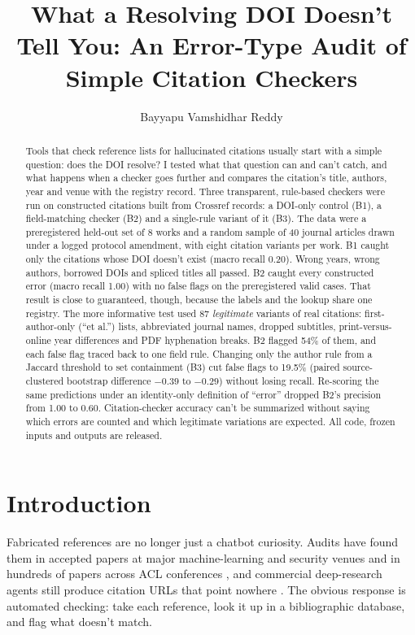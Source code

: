 \documentclass[acmsmall,screen,nonacm]{acmart}
\title{What a Resolving DOI Doesn't Tell You: An Error-Type Audit of Simple Citation Checkers}
\author{Bayyapu Vamshidhar Reddy}
\affiliation{\institution{Indian Institute of Information Technology Allahabad}\city{Prayagraj}\country{India}}
\newcommand{\BOne}{B1}
\newcommand{\BTwo}{B2}
\newcommand{\BThree}{B3}
\begin{document}
\begin{abstract}
Tools that check reference lists for hallucinated citations usually start with a simple question: does the DOI resolve? I tested what that question can and can't catch, and what happens when a checker goes further and compares the citation's title, authors, year and venue with the registry record. Three transparent, rule-based checkers were run on constructed citations built from Crossref records: a DOI-only control (\BOne{}), a field-matching checker (\BTwo{}) and a single-rule variant of it (\BThree{}). The data were a preregistered held-out set of 8 works and a random sample of 40 journal articles drawn under a logged protocol amendment, with eight citation variants per work. \BOne{} caught only the citations whose DOI doesn't exist (macro recall 0.20). Wrong years, wrong authors, borrowed DOIs and spliced titles all passed. \BTwo{} caught every constructed error (macro recall 1.00) with no false flags on the preregistered valid cases. That result is close to guaranteed, though, because the labels and the lookup share one registry. The more informative test used 87 \emph{legitimate} variants of real citations: first-author-only (``et al.'') lists, abbreviated journal names, dropped subtitles, print-versus-online year differences and PDF hyphenation breaks. \BTwo{} flagged 54\% of them, and each false flag traced back to one field rule. Changing only the author rule from a Jaccard threshold to set containment (\BThree{}) cut false flags to 19.5\% (paired source-clustered bootstrap difference $-0.39$ to $-0.29$) without losing recall. Re-scoring the same predictions under an identity-only definition of ``error'' dropped \BTwo{}'s precision from 1.00 to 0.60. Citation-checker accuracy can't be summarized without saying which errors are counted and which legitimate variations are expected. All code, frozen inputs and outputs are released.
\end{abstract}

\maketitle

\section{Introduction}
Fabricated references are no longer just a chatbot curiosity. Audits have found them in accepted papers at major machine-learning and security venues \citep{russinovich2026} and in hundreds of papers across ACL conferences \citep{sakai2026}, and commercial deep-research agents still produce citation URLs that point nowhere \citep{rao2026}. The obvious response is automated checking: take each reference, look it up in a bibliographic database, and flag what doesn't match.
\end{document}
